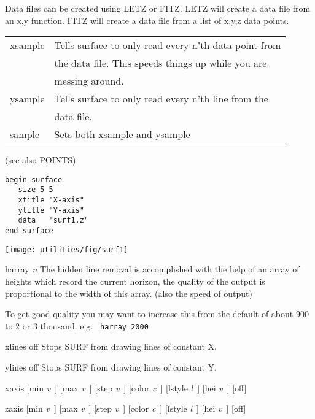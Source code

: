 \begin{commanddescription}
Data files can be created using LETZ or FITZ.
LETZ will create a data file from an x,y function.
FITZ will create a data file from a list of x,y,z data points.

\begin{tabular}{ll}
xsample & Tells surface to only read every n'th data point from\\
        & the data file.  This speeds things up while you are\\
        & messing around.\\[1.5ex]
ysample & Tells surface to only read every n'th line from the\\
        & data file.\\[1.5ex]
sample  & Sets both xsample and ysample\\
\end{tabular}
(see also POINTS)

\begin{minipage}[c]{8cm}
\begin{Verbatim}
begin surface
   size 5 5 
   xtitle "X-axis"
   ytitle "Y-axis"
   data   "surf1.z"
end surface
\end{Verbatim}
\end{minipage}
\hfill
\begin{minipage}[c]{7cm}
\mbox{\texttt{[image: utilities/fig/surf1]}}
\end{minipage}

\item[{\sf harray {\it n}}]
The hidden line removal is accomplished with the help of
an array of heights which record the current horizon,  the
quality of the output is proportional to the width of this
array.  (also the speed of output)

To get good quality you may want to increase this from
the default of about 900 to 2 or 3 thousand. 
e.g. \verb# harray 2000#

\item[{\sf xlines off}]
Stops SURF from drawing lines of constant X.

\item[{\sf ylines off}]
Stops SURF from drawing lines of constant Y.

\item[{\sf xaxis [min {\it v}\ ]  [max {\it v}\ ]  [step {\it v}\ ]  [color {\it
c}\ ] [lstyle {\it l}\ ] [hei {\it v}\ ] [off] }]

\item[{\sf zaxis [min {\it v}\ ]  [max {\it v}\ ]  [step {\it v}\ ]  [color {\it
c}\ ] [lstyle {\it l}\ ] [hei {\it v}\ ] [off] }]


\end{commanddescription}
